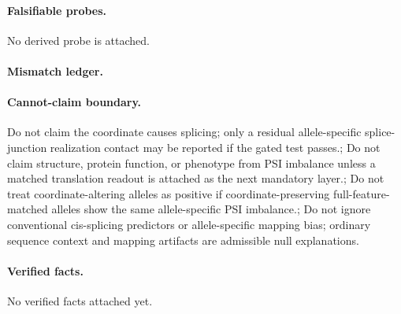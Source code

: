 \paragraph{Falsifiable probes.}
No derived probe is attached.

\paragraph{Mismatch ledger.}
\paragraph{Cannot-claim boundary.} Do not claim the coordinate causes splicing; only a residual allele-specific splice-junction realization contact may be reported if the gated test passes.; Do not claim structure, protein function, or phenotype from PSI imbalance unless a matched translation readout is attached as the next mandatory layer.; Do not treat coordinate-altering alleles as positive if coordinate-preserving full-feature-matched alleles show the same allele-specific PSI imbalance.; Do not ignore conventional cis-splicing predictors or allele-specific mapping bias; ordinary sequence context and mapping artifacts are admissible null explanations.

\paragraph{Verified facts.}
No verified facts attached yet.
